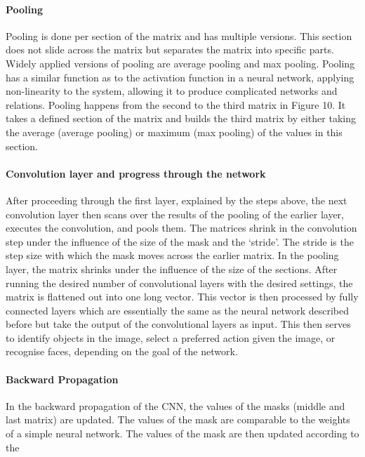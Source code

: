 \paragraph{Pooling}
Pooling is done per section of the matrix and has multiple versions. This section does not slide across the matrix but separates the matrix into specific parts. Widely applied versions of pooling are average pooling and max pooling. Pooling has a similar function as to the activation function in a neural network, applying non-linearity to the system, allowing it to produce complicated networks and relations. Pooling happens from the second to the third matrix in Figure 10. It takes a defined section of the matrix and builds the third matrix by either taking the average (average pooling) or maximum (max pooling) of the values in this section. 

\paragraph{Convolution layer and progress through the network}
After proceeding through the first layer, explained by the steps above, the next convolution layer then scans over the results of the pooling of the earlier layer, executes the convolution, and pools them. The matrices shrink in the convolution step under the influence of the size of the mask and the \lq stride\rq . The stride is the step size with which the mask moves across the earlier matrix. In the pooling layer, the matrix shrinks under the influence of the size of the sections. 
After running the desired number of convolutional layers with the desired settings, the matrix is flattened out into one long vector. This vector is then processed by fully connected layers which are essentially the same as the neural network described before but take the output of the convolutional layers as input. This then serves to identify objects in the image, select a preferred action given the image, or recognise faces, depending on the goal of the network.

\paragraph{Backward Propagation}
In the backward propagation of the CNN, the values of the masks (middle and last matrix) are updated. The values of the mask are comparable to the weights of a simple neural network. The values of the mask are then updated according to the

